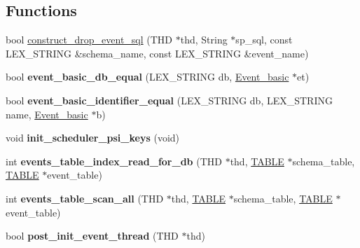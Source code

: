 \subsection*{Functions}
\begin{DoxyCompactItemize}
\item 
bool \mbox{\hyperlink{group__Event__Scheduler_ga952e506d8f76739d416da0fb7169fac3}{construct\+\_\+drop\+\_\+event\+\_\+sql}} (T\+HD $\ast$thd, String $\ast$sp\+\_\+sql, const L\+E\+X\+\_\+\+S\+T\+R\+I\+NG \&schema\+\_\+name, const L\+E\+X\+\_\+\+S\+T\+R\+I\+NG \&event\+\_\+name)
\item 
\mbox{\label{group__Event__Scheduler_gacad056b8544f7ea1e3ee0186bad1723a}} 
bool {\bfseries event\+\_\+basic\+\_\+db\+\_\+equal} (L\+E\+X\+\_\+\+S\+T\+R\+I\+NG db, \mbox{\hyperlink{classEvent__basic}{Event\+\_\+basic}} $\ast$et)
\item 
\mbox{\label{group__Event__Scheduler_ga00f6ae4f5b433f002595b969c843203d}} 
bool {\bfseries event\+\_\+basic\+\_\+identifier\+\_\+equal} (L\+E\+X\+\_\+\+S\+T\+R\+I\+NG db, L\+E\+X\+\_\+\+S\+T\+R\+I\+NG name, \mbox{\hyperlink{classEvent__basic}{Event\+\_\+basic}} $\ast$b)
\item 
\mbox{\label{group__Event__Scheduler_ga1c809f091f9bd7c50b49ee5fbaa02c79}} 
void {\bfseries init\+\_\+scheduler\+\_\+psi\+\_\+keys} (void)
\item 
\mbox{\label{group__Event__Scheduler_gac6a9708fc4344111abc8f8f2e7d13b36}} 
int {\bfseries events\+\_\+table\+\_\+index\+\_\+read\+\_\+for\+\_\+db} (T\+HD $\ast$thd, \mbox{\hyperlink{structTABLE}{T\+A\+B\+LE}} $\ast$schema\+\_\+table, \mbox{\hyperlink{structTABLE}{T\+A\+B\+LE}} $\ast$event\+\_\+table)
\item 
\mbox{\label{group__Event__Scheduler_gad47d26a9ee0a49c6a91a13b6678c696e}} 
int {\bfseries events\+\_\+table\+\_\+scan\+\_\+all} (T\+HD $\ast$thd, \mbox{\hyperlink{structTABLE}{T\+A\+B\+LE}} $\ast$schema\+\_\+table, \mbox{\hyperlink{structTABLE}{T\+A\+B\+LE}} $\ast$event\+\_\+table)
\item 
\mbox{\label{group__Event__Scheduler_gaed4039fa124c55c7af5633c333596418}} 
bool {\bfseries post\+\_\+init\+\_\+event\+\_\+thread} (T\+HD $\ast$thd)

\end{DoxyCompactItemize}
